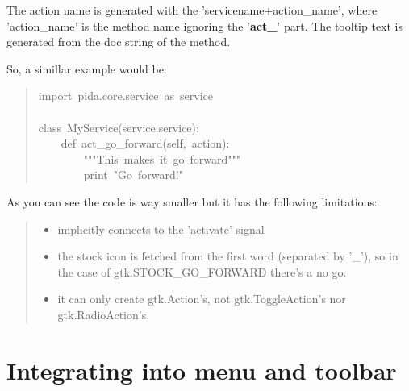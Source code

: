 \documentclass[10pt,a4paper,english]{article}
\begin{document}
The action name is generated with the 'servicename+action{\_}name', where
'action{\_}name' is the method name ignoring the '{\color{red}\bfseries{}act{\_}}' part. The tooltip text is
generated from the doc string of the method.

So, a simillar example would be:
\begin{quote}{\ttfamily \raggedright \noindent
import~pida.core.service~as~service~\\
~\\
class~MyService(service.service):~\\
~~~~def~act{\_}go{\_}forward(self,~action):~\\
~~~~~~~~"{}"{}"This~makes~it~go~forward"{}"{}"~\\
~~~~~~~~print~"Go~forward!"
}\end{quote}

As you can see the code is way smaller but it has the following limitations:
\begin{quote}
\begin{itemize}
\item {} 
implicitly connects to the 'activate' signal

\item {} 
the stock icon is fetched from the first word (separated by '{\_}'), so in the
case of gtk.STOCK{\_}GO{\_}FORWARD there's a no go.

\item {} 
it can only create gtk.Action's, not gtk.ToggleAction's nor
gtk.RadioAction's.

\end{itemize}
\end{quote}



\hypertarget{integrating-into-menu-and-toolbar}{}
\section*{Integrating into menu and toolbar}
\end{document}
